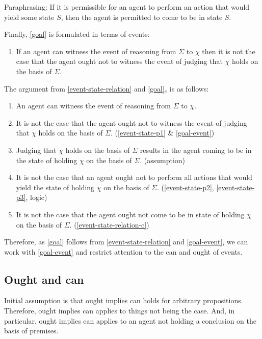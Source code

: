 \documentclass[10pt]{article}
\begin{document}
Paraphrasing: If it is permissible for an agent to perform an action that would yield some state \(S\), then the agent is permitted to come to be in state \(S\).

Finally, \ref{goal} is formulated in terms of events:

\begin{enumerate}[label=G\arabic*\(_{e}\)., ref=G\arabic*\(_{e}\)]
\item\label{goal-event} If an agent can witness the event of reasoning from \(\Sigma\) to \(\chi\) then it is not the case that the agent ought not to witness the event of judging that \(\chi\) holds on the basis of \(\Sigma\).
\end{enumerate}

The argument from \ref{event-state-relation} and \ref{goal}\(_{e}\) is as follows:

\begin{enumerate}
\item\label{event-state-p1} An agent can witness the event of reasoning from \(\Sigma\) to \(\chi\).
\item\label{event-state-p2} It is not the case that the agent ought not to witness the event of judging that \(\chi\) holds on the basis of \(\Sigma\). \hfill (\ref{event-state-p1} \& \ref{goal-event})
\item Judging that \(\chi\) holds on the basis of \(\Sigma\) results in the agent coming to be in the state of holding \(\chi\) on the basis of \(\Sigma\). \hfill (assumption)
\item\label{event-state-p3} It is not the case that an agent ought not to perform all actions that would yield the state of holding \(\chi\) on the basis of \(\Sigma\). \hfill (\ref{event-state-p2}, \ref{event-state-p3}, logic)
\item It is not the case that the agent ought not come to be in state of holding \(\chi\) on the basis of \(\Sigma\). \hfill (\ref{event-state-relation-c})
\end{enumerate}

Therefore, as \ref{goal} follows from \ref{event-state-relation} and \ref{goal-event}, we can work with \ref{goal-event} and restrict attention to the can and ought of events.

\subsection{Ought and can}
\label{sec:ought-can}

Initial assumption is that ought implies can holds for arbitrary propositions.
Therefore, ought implies can applies to things not being the case.
And, in particular, ought implies can applies to an agent not holding a conclusion on the basis of premises.
\end{document}
